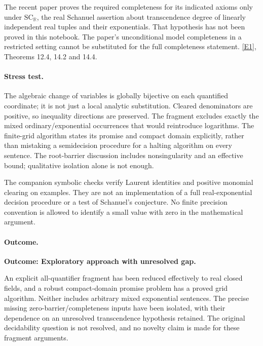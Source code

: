 \documentclass[11pt,a4paper]{article}
\newcommand{\R}{\mathbb{R}}
\newcommand{\eref}[2]{\hyperlink{extra:#1:#2}{[E#2]}}
\numberwithin{equation}{section}
\begin{document}
The recent paper proves the required completeness for its indicated
axioms only under $\mathrm{SC}_{\R}$, the real Schanuel assertion about
transcendence degree of linearly independent real tuples and their
exponentials.  That hypothesis has not been proved in this notebook.
The paper's unconditional model completeness in a restricted setting
cannot be substituted for the full completeness statement.
\eref{124}{1}, Theorems 12.4, 14.2 and 14.4.

\paragraph{Stress test.}
The algebraic change of variables is globally bijective on each
quantified coordinate; it is not just a local analytic substitution.
Cleared denominators are positive, so inequality directions are
preserved.  The fragment excludes exactly the mixed ordinary/exponential
occurrences that would reintroduce logarithms.  The finite-grid algorithm
states its promise and compact domain explicitly, rather than mistaking
a semidecision procedure for a halting algorithm on every sentence.
The root-barrier discussion includes nonsingularity and an effective
bound; qualitative isolation alone is not enough.

The companion symbolic checks verify Laurent identities and positive
monomial clearing on examples.  They are not an implementation of a
full real-exponential decision procedure or a test of Schanuel's
conjecture.  No finite precision convention is allowed to identify a
small value with zero in the mathematical argument.

\paragraph{Outcome.}
\textbf{Outcome: Exploratory approach with unresolved gap.}

An explicit all-quantifier fragment has been reduced effectively to
real closed fields, and a robust compact-domain promise problem has a
proved grid algorithm.  Neither includes arbitrary mixed exponential
sentences.  The precise missing zero-barrier/completeness inputs have
been isolated, with their dependence on an unresolved transcendence
hypothesis retained.  The original decidability question is not resolved,
and no novelty claim is made for these fragment arguments.
\end{document}
